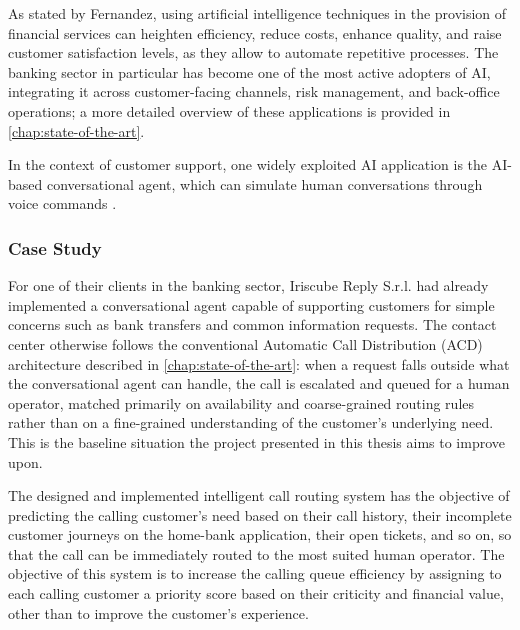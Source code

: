 \documentclass[12pt,a4paper,openright,twoside]{book}
\begin{document}
As stated by Fernandez, using artificial intelligence techniques in the provision of financial services can heighten efficiency,
reduce costs, enhance quality, and raise customer satisfaction levels, as they allow to automate repetitive processes.
The banking sector in particular has become one of the most active adopters of AI, integrating it across customer-facing channels,
risk management, and back-office operations; a more detailed overview of these applications is provided in \cref{chap:state-of-the-art}.

In the context of customer support, one widely exploited AI application is the AI-based conversational agent,
which can simulate human conversations through voice commands \cite{zhang2023impact}.

\subsubsection{Case Study}
For one of their clients in the banking sector, Iriscube Reply S.r.l. had already implemented a conversational agent
capable of supporting customers for simple concerns such as bank transfers and common information requests.
The contact center otherwise follows the conventional Automatic Call Distribution (ACD)
architecture described in \cref{chap:state-of-the-art}: when a request falls outside what the conversational agent can handle,
the call is escalated and queued for a human operator, matched primarily on availability and coarse-grained routing rules rather
than on a fine-grained understanding of the customer's underlying need.
This is the baseline situation the project presented in this thesis aims to improve upon.

The designed and implemented intelligent call routing system has the objective of predicting the calling customer's
need based on their call history, their incomplete customer journeys on the home-bank application, their open tickets, and so on,
so that the call can be immediately routed to the most suited human operator.
The objective of this system is to increase the calling queue efficiency by assigning to each calling customer a priority score based
on their criticity and financial value, other than to improve the customer's experience.
\label{donne-ricche}
\end{document}
